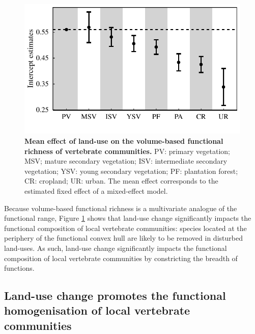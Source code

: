 \begin{figure}[h!]
\centering
\includegraphics[scale=0.70]{figures/chapter3/FRic/Mean_effect_LU}
\caption[Mean effect of land-use on the volume-based functional richness of vertebrate communities]{\textbf{Mean effect of land-use on the volume-based functional richness of vertebrate communities.} PV: primary vegetation; MSV; mature secondary vegetation; ISV: intermediate secondary vegetation; YSV: young secondary vegetation; PF: plantation forest; CR: cropland; UR: urban. The mean effect corresponds to the estimated fixed effect of a mixed-effect model.}
\label{LU_mean_FRic}
\end{figure}

Because volume-based functional richness is a multivariate analogue of the functional range, Figure \ref{LU_mean_FRic} shows that land-use change significantly impacts the functional composition of local vertebrate communities: species located at the periphery of the functional convex hull are likely to be removed in disturbed land-uses. As such, land-use change significantly impacts the functional composition of local vertebrate communities by constricting the breadth of functions.   

\subsection{Land-use change promotes the functional homogenisation of local vertebrate communities}

